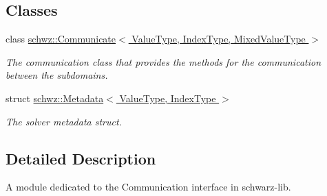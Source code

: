 \subsection*{Classes}
\begin{DoxyCompactItemize}
\item 
class \hyperlink{classschwz_1_1Communicate}{schwz\+::\+Communicate$<$ Value\+Type, Index\+Type, Mixed\+Value\+Type $>$}
\begin{DoxyCompactList}\small\item\em The communication class that provides the methods for the communication between the subdomains. \end{DoxyCompactList}\item 
struct \hyperlink{structschwz_1_1Metadata}{schwz\+::\+Metadata$<$ Value\+Type, Index\+Type $>$}
\begin{DoxyCompactList}\small\item\em The solver metadata struct. \end{DoxyCompactList}\end{DoxyCompactItemize}


\subsection{Detailed Description}
A module dedicated to the Communication interface in schwarz-\/lib. 

